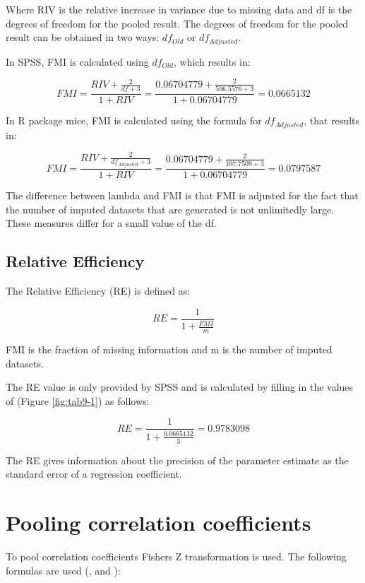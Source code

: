 \documentclass[]{book}
\begin{document}
Where RIV is the relative increase in variance due to missing data and
df is the degrees of freedom for the pooled result. The degrees of
freedom for the pooled result can be obtained in two ways:
\({df_{Old}}\) or \({df_{Adjusted}}\).

In SPSS, FMI is calculated using \({df_{Old}}\), which results in:

\[FMI = \frac{RIV + \frac{2}{df+3}}{1+RIV}=\frac{0.06704779 + \frac{2}{506.5576+3}}{1+0.06704779}=0.0665132\]

In R package mice, FMI is calculated using the formula for
\({df_{Adjusted}}\), that results in:

\[FMI = \frac{RIV + \frac{2}{df_{Adjusted}+3}}{1+RIV}=\frac{0.06704779 + \frac{2}{107.7509+3}}{1+0.06704779}=0.0797587\]

The difference between lambda and FMI is that FMI is adjusted for the
fact that the number of imputed datasets that are generated is not
unlimitedly large. These measures differ for a small value of the df.

\section{Relative Efficiency}\label{relative-efficiency}

The Relative Efficiency (RE) is defined as:

\begin{equation}
RE = \frac{1}{1+\frac{FMI}{m}}
  \label{eq:re}
\end{equation}

FMI is the fraction of missing information and m is the number of
imputed datasets.

The RE value is only provided by SPSS and is calculated by filling in
the values of (Figure \ref{fig:tab9-1}) as follows:

\[RE = \frac{1}{1+\frac{0.0665132}{3}}=0.9783098\]

The RE gives information about the precision of the parameter estimate
as the standard error of a regression coefficient.

\chapter{Pooling correlation
coefficients}\label{pooling-correlation-coefficients-1}

To pool correlation coefficients Fishers Z transformation is used. The
following formulas are used (\citet{raghunathan2016},
\citet{VanBuuren2018} and \citet{enders2010applied}):
\end{document}
